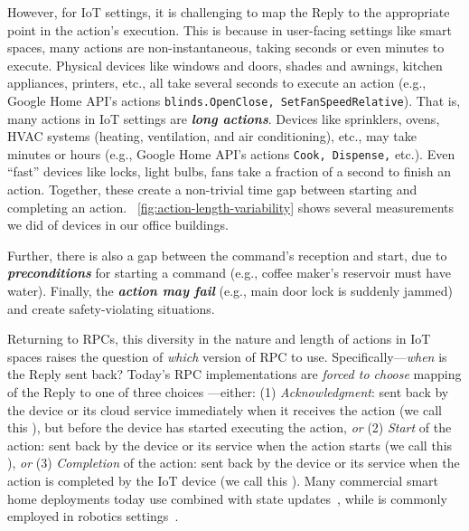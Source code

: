 However, for IoT settings, it is challenging to map the Reply to the appropriate point in the action's execution. 
This is because in user-facing settings like smart spaces, many actions are non-instantaneous, taking seconds or even minutes to execute. 
Physical devices like windows and doors, shades and awnings, kitchen appliances, printers, etc., all 
take several seconds to execute an action (e.g., Google Home API's actions {\tt blinds.OpenClose, SetFanSpeedRelative}). That is, many actions in IoT settings are \textbf{\textit{long actions}}. 
Devices like sprinklers, ovens, HVAC systems (heating, ventilation, and air conditioning), etc., may take minutes or hours (e.g., Google Home API's actions {\tt Cook, Dispense,} etc.). Even ``fast'' devices like locks, light bulbs, fans
take a fraction of a second to finish an action. Together, these create a
non-trivial time gap between starting and completing an action. 
\Figure~\ref{fig:action-length-variability} shows several measurements we did of devices in our office buildings. 

Further, there is also a gap between the command's reception and start, due to
\textbf{\textit{preconditions}} for starting a command (e.g., coffee maker's reservoir
{must have} water). Finally, the \textbf{\textit{action may fail}} (e.g., main door lock is suddenly jammed) and create safety-violating situations. 

Returning to RPCs, 
this diversity in the nature and length of actions in IoT spaces raises the question of {\it which} version of RPC to use. Specifically---{\it when} is the Reply sent back? 
Today's RPC implementations are {\it forced to choose}  mapping of the Reply to one of three choices
---either: (1) {\it Acknowledgment}: sent back by the device or its
{cloud} service immediately when it receives the action (we call this {\it \RPCa}), but before the device has started executing the action, {\it or} (2) {\it Start} of the action: sent back by the device or its service when the action starts (we call this {\it \RPCs}), {\it or} (3) {\it Completion} of the action: sent back by the device or its service when the action is completed by the IoT device (we call this {\it \RPCc}). Many commercial smart home deployments today use  \RPCa{} combined with state updates~\cite{Alexa, GoogleHome}, while \RPCc{} is commonly employed in robotics settings~\cite{RECOVER_Cornelio, Zhang_2019_CVPR}.

